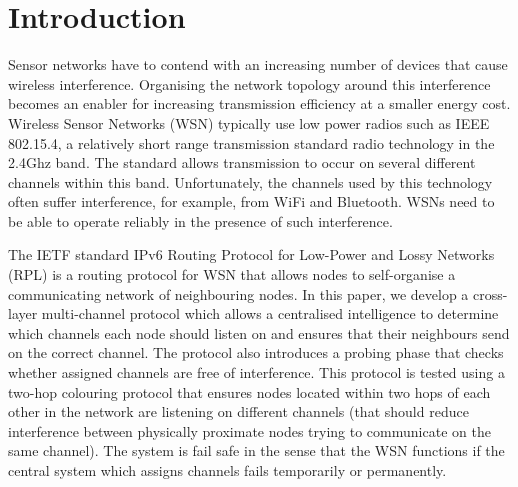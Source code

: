 \section{Introduction}
\label{sec:introduction}

Sensor networks have to contend with an increasing number of devices that cause wireless interference. Organising the network topology around this interference becomes an enabler for increasing transmission efficiency at a smaller energy cost. Wireless Sensor Networks (WSN) typically use low power radios such as IEEE 802.15.4, a relatively short range transmission standard radio technology in the 2.4Ghz band. The standard allows transmission to occur on several different channels within this band.  Unfortunately, the
channels used by this technology often suffer interference, for example, from WiFi and Bluetooth. WSNs need to be able to operate reliably in the presence of such interference.  

The IETF standard IPv6 Routing Protocol for Low-Power and Lossy Networks (RPL) is a routing protocol for WSN that allows nodes to self-organise a communicating network of neighbouring nodes. In this paper, we develop a cross-layer multi-channel protocol which allows a centralised intelligence to determine which channels each node should listen on and ensures that their neighbours send on the correct channel. The protocol also introduces a probing phase that checks whether assigned channels are free of interference.  This protocol is tested using a two-hop colouring protocol that ensures nodes located within two hops of each other in the network are listening on different channels (that should reduce interference between physically proximate nodes trying to communicate on the same channel).  The system is fail safe in the sense that the WSN functions if the central system which assigns channels fails temporarily or permanently.


